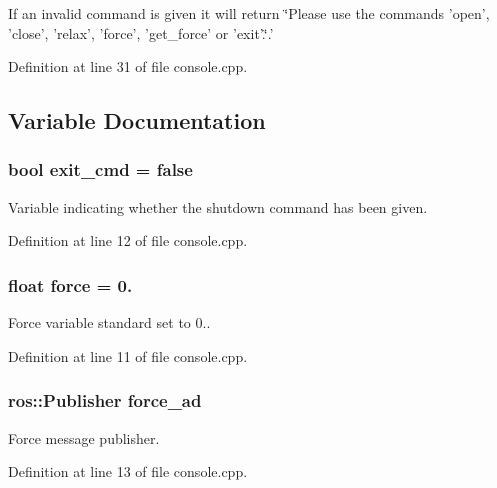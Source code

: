 If an invalid command is given it will return \char`\"{}\-Please use the commands 'open', 'close', 'relax', 'force', 'get\-\_\-force' or 'exit'.\char`\"{}.' 

Definition at line 31 of file console.\-cpp.



\subsection{Variable Documentation}
\subsubsection[{exit\-\_\-cmd}]{\setlength{\rightskip}{0pt plus 5cm}bool exit\-\_\-cmd = false}\label{console_8cpp_a088d079630f5be4a5d3e0088f73be546}
Variable indicating whether the shutdown command has been given. 

Definition at line 12 of file console.\-cpp.

\subsubsection[{force}]{\setlength{\rightskip}{0pt plus 5cm}float force = 0.}\label{console_8cpp_ad0952eff2667e5af2b307ba4f6d0b06b}
Force variable standard set to 0.. 

Definition at line 11 of file console.\-cpp.

\subsubsection[{force\-\_\-ad}]{\setlength{\rightskip}{0pt plus 5cm}ros\-::\-Publisher force\-\_\-ad}\label{console_8cpp_a663ced0a7f6b298b0ca0f30fa3c3cbb5}
Force message publisher. 

Definition at line 13 of file console.\-cpp.

